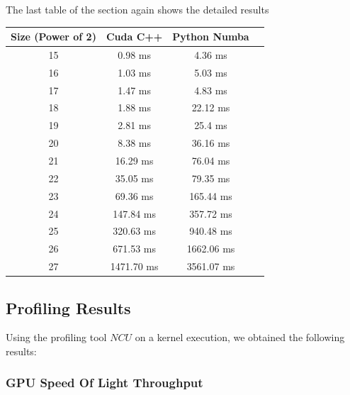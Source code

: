 \documentclass[a4paper, 12pt, oneside]{article}
\begin{document}
The last table of the section again shows the detailed results

\begin{center}
  \begin{tabular}{ |c|c|c|c| }
    \hline
    \textbf{Size (Power of 2)} & \textbf{Cuda C++} & \textbf{Python Numba} \\
    \hline
    15                         & 0.98 ms           & 4.36 ms               \\
    16                         & 1.03 ms           & 5.03 ms               \\
    17                         & 1.47 ms           & 4.83 ms               \\
    18                         & 1.88 ms           & 22.12 ms              \\
    19                         & 2.81 ms           & 25.4 ms               \\
    20                         & 8.38 ms           & 36.16 ms              \\
    21                         & 16.29 ms          & 76.04 ms              \\
    22                         & 35.05 ms          & 79.35 ms              \\
    23                         & 69.36 ms          & 165.44 ms             \\
    24                         & 147.84 ms         & 357.72 ms             \\
    25                         & 320.63 ms         & 940.48 ms             \\
    26                         & 671.53 ms         & 1662.06 ms            \\
    27                         & 1471.70 ms        & 3561.07 ms            \\
    \hline
  \end{tabular}
\end{center}

\subsection{Profiling Results}

Using the profiling tool $NCU$ on a kernel execution, we obtained the following results:\\

\subsubsection{GPU Speed Of Light Throughput}
\end{document}
